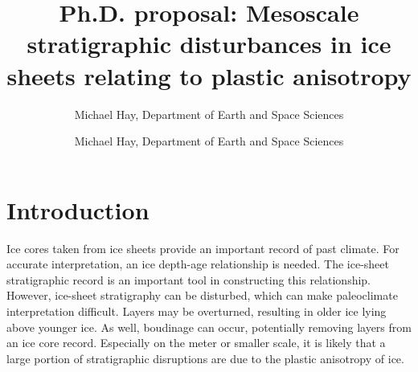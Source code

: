 \documentclass{article}
\author{Michael Hay, Department of Earth and Space Sciences}
\begin{document}
\title{Ph.D. proposal: Mesoscale stratigraphic disturbances in ice sheets relating to plastic anisotropy}

\author{Michael Hay,
Department of Earth and Space Sciences}

\maketitle
\section{Introduction}
Ice cores taken from ice sheets provide an important record of past climate.  For accurate interpretation, an ice depth-age relationship is needed. The ice-sheet stratigraphic record is an important tool in constructing this relationship. However, ice-sheet stratigraphy can be disturbed, which can make paleoclimate interpretation difficult. Layers may be overturned, resulting in older ice lying above younger ice. As well, boudinage can occur, potentially removing layers from an ice core record. Especially on the meter or smaller scale, it is likely that a large portion of stratigraphic disruptions are due to the plastic anisotropy of ice.
\end{document}
